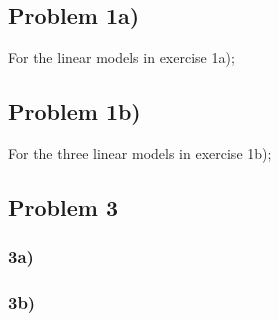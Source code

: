 \documentclass[a4paper,11pt]{article}
\begin{document}
\subsection{Problem 1a)}
\label{app:b}

For the linear models in exercise 1a);
{\footnotesize
    
}

\subsection{Problem 1b)}
\label{app:b}

For the three linear models in exercise 1b);
{\footnotesize
    
}

\subsection{Problem 3}
\subsubsection{3a)}
{\footnotesize
    
}


\subsubsection{3b)}
{\footnotesize
    
}



%
\end{document}
